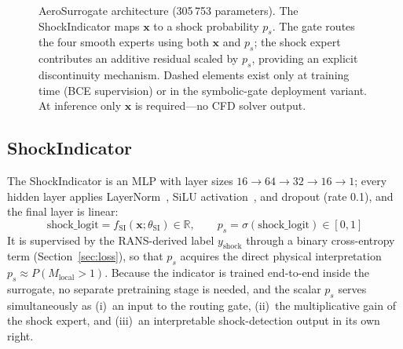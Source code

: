 \documentclass{WCCM-ECCOMAS_2026_Full_Paper}
\begin{document}
\begin{figure}[ht]
\caption{AeroSurrogate architecture (305\,753 parameters).  The
  ShockIndicator maps $\mathbf{x}$ to a shock probability $p_s$.  The
  gate routes the four smooth experts using both $\mathbf{x}$ and
  $p_s$; the shock expert contributes an additive residual scaled by
  $p_s$, providing an explicit discontinuity mechanism.  Dashed
  elements exist only at training time (BCE supervision) or in the
  symbolic-gate deployment variant.  At inference only $\mathbf{x}$
  is required---no CFD solver output.}
\label{fig:architecture}
\end{figure}

\subsection{ShockIndicator}
\label{sec:indicator}

The ShockIndicator is an MLP with layer sizes
$16\!\to\!64\!\to\!32\!\to\!16\!\to\!1$; every hidden layer applies
LayerNorm~\cite{Ba2016}, SiLU activation~\cite{Elfwing2018}, and
dropout (rate 0.1), and the final layer is linear:
\begin{equation}
  \mathrm{shock\_logit} = f_{\mathrm{SI}}(\mathbf{x};\theta_{\mathrm{SI}})
  \in \mathbb{R},
  \qquad
  p_s = \sigma(\mathrm{shock\_logit}) \in [0,1]
  \label{eq:indicator}
\end{equation}
It is supervised by the RANS-derived label $y_{\mathrm{shock}}$
through a binary cross-entropy term (Section~\ref{sec:loss}), so that
$p_s$ acquires the direct physical interpretation
$p_s \approx P(M_{\mathrm{local}} > 1)$.  Because the indicator is
trained end-to-end inside the surrogate, no separate pretraining stage
is needed, and the scalar $p_s$ serves simultaneously as (i)~an
input to the routing gate, (ii)~the multiplicative gain of the shock
expert, and (iii)~an interpretable shock-detection output in its own
right.
\end{document}
